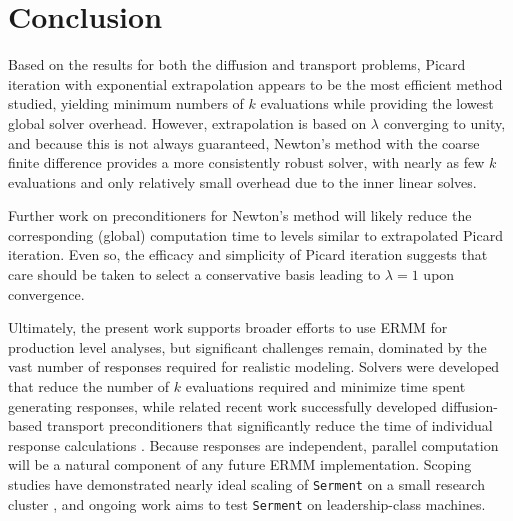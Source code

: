 \section{Conclusion}
\label{sec:conclusion}

Based on the results for both the diffusion and transport problems, Picard 
iteration with exponential extrapolation appears to be the most
efficient method studied, yielding minimum numbers of $k$ evaluations 
while providing the lowest global solver overhead.  However,  
extrapolation is based on $\lambda$ converging to unity, and because this 
is not always guaranteed, Newton's method with the coarse finite difference 
provides a more consistently robust solver, with nearly as 
few $k$ evaluations and only relatively small overhead due to the 
inner linear solves.

Further work on preconditioners for Newton's method 
will likely reduce the corresponding (global) computation time 
to levels similar to extrapolated Picard iteration.  
Even so, the efficacy and 
simplicity of Picard iteration suggests that care should be taken to 
select a conservative basis leading to $\lambda = 1$ upon convergence.

Ultimately, the present work supports broader efforts to use 
ERMM for production level analyses, but significant challenges remain,
dominated by the vast number of responses required for realistic 
modeling.  Solvers were developed that reduce the number of $k$ evaluations 
required and minimize time spent generating  
responses, while related recent work successfully developed diffusion-based 
transport preconditioners that significantly reduce the time of 
individual response calculations \cite{roberts2014dpm}.  Because 
responses are independent, parallel computation will be a natural
component of 
any future ERMM implementation.  Scoping studies have demonstrated 
nearly ideal scaling of {\tt Serment} on a small research 
cluster \cite{roberts2014arm}, and ongoing work aims to test {\tt Serment} on 
leadership-class machines.
